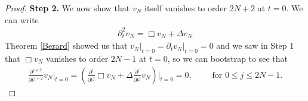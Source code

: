 \documentclass[11pt,letterpaper,oneside]{amsart}
\theoremstyle{definition}
\theoremstyle{remark}
\renewcommand{\d}{\partial}
\theoremstyle{definition}
\theoremstyle{remark}
\begin{document}
\begin{proof}
    \medskip
    
    \noindent \textbf{Step 2.} We now show that $v_N$ itself vanishes to order $2N + 2$ at $t = 0$. We can write
    \begin{align*}
        \d_t^2 v_N = \Box v_N + \Delta v_N
    \end{align*}
    Theorem \ref{Berard} showed us that $v_N \big|_{t= 0} = \d_t v_N \big|_{t = 0} = 0$ and we saw in Step $1$ that $\Box v_N$ vanishes to order $2N - 1$ at $t = 0$, so we can bootstrap to see that
    \begin{align*}
        \frac{\d^{j+2}}{\d t^{j + 2}} v_N \Big|_{t = 0} = \left(\frac{\d^j}{\d t^j} \Box v_N + \Delta \frac{\d^j}{\d t^{j}} v_N \right) \Bigg|_{t = 0} = 0, \qquad \text{ for }0 \leq j \leq 2N - 1.
    \end{align*}
    
    \medskip
    

\end{proof}
\end{document}

